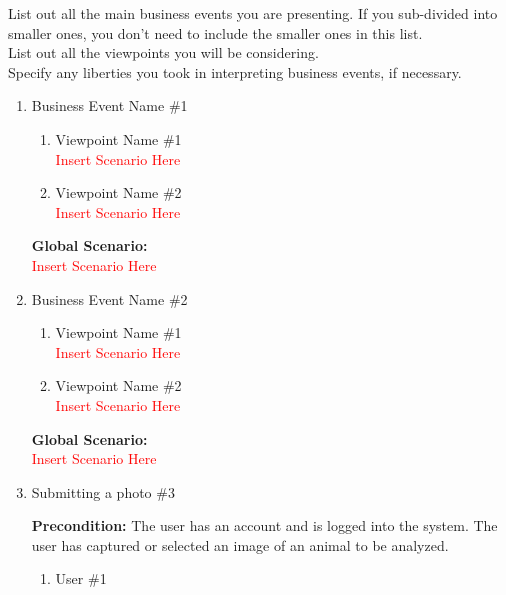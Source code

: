 \documentclass[]{article}
\begin{document}
 List out all the main business events you are presenting. If you sub-divided into smaller ones, you don't need to include the smaller ones in this list.\\

 List out all the viewpoints you will be considering.\\

 Specify any liberties you took in interpreting business events, if necessary.\\

\begin{enumerate}[{\bf BE1.}]
	\item Business Event Name \#1
		\begin{enumerate}[{\bf VP1.}]
			\item Viewpoint Name \#1 \\
				\textcolor{red}{Insert Scenario Here}
			\item Viewpoint Name \#2 \\
				\textcolor{red}{Insert Scenario Here}
		\end{enumerate}
		{\bf Global Scenario:}\\
		\textcolor{red}{Insert Scenario Here}
	\item Business Event Name \#2
	\begin{enumerate}[{\bf VP1.}]
		\item Viewpoint Name \#1 \\
		\textcolor{red}{Insert Scenario Here}
		\item Viewpoint Name \#2 \\
		\textcolor{red}{Insert Scenario Here}
	\end{enumerate}
	{\bf Global Scenario:}\\
	\textcolor{red}{Insert Scenario Here}

    \item Submitting a photo \#3

    \textbf{Precondition:} The user has an account and is logged into the system. The user has captured or selected an image of an animal to be analyzed.

	\begin{enumerate}[{\bf VP1.}]
		\item User \#1 \\
		

\end{enumerate}
\end{enumerate}
\end{document}
